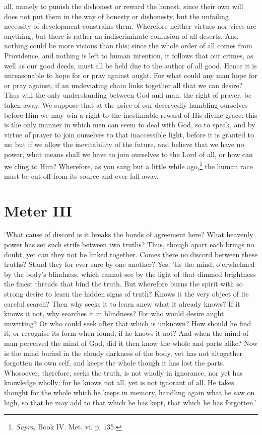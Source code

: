 all, namely to punish the dishonest or reward the honest, since their
own will does not put them in the way of  honesty or
dishonesty, but the unfailing necessity of development constrains
them. Wherefore neither virtues nor vices are anything, but there is
rather an indiscriminate confusion of all deserts. And nothing could
be more vicious than this; since the whole order of all comes from
Providence, and nothing is left to human intention, it follows that
our crimes, as well as our good deeds, must all be held due to the
author of all good. Hence it is unreasonable to hope for or pray
against aught. For what could any man hope for or pray against, if an
undeviating chain links together all that we can desire? Thus will the
only understanding between God and man, the right of prayer, be taken
away. We suppose that at the price of our deservedly humbling
ourselves before Him we may win a right to the inestimable reward of
His divine grace: this is the only manner in which men can seem to
deal with God, so to speak, and by virtue of prayer to join ourselves
to that inaccessible light, before it is granted to us; but if we
allow the inevitability of the future, and believe that we have no
power, what means shall we have to join ourselves to the Lord of all,
or how can we cling to Him? Wherefore, as you sang but a little while
ago,\footnote{\textit{Supra}, Book \textsc{IV}. Met. vi. p. 135.} the
human race must be cut off from its source and ever fall away.

\section*{Meter III}

`What cause of discord is it breaks the  bonds of agreement
here? What heavenly power has set such strife between two truths?
Thus, though apart each brings no doubt, yet can they not be linked
together. Comes there no discord between these truths? Stand they for
ever sure by one another? Yes, 'tis the mind, o'erwhelmed by the
body's blindness, which cannot see by the light of that dimmed
brightness the finest threads that bind the truth. But wherefore burns
the spirit with so strong desire to learn the hidden signs of truth?
Knows it the very object of its careful search? Then why seeks it to
learn anew what it already knows? If it knows it not, why searches it
in blindness? For who would desire aught unwitting? Or who could seek
after that which is unknown? How should he find it, or recognise its
form when found, if he knows it not? And when the mind of man
perceived the mind of God, did it then know the whole and parts alike?
Now is the mind buried in the cloudy darkness of the body, yet has not
altogether forgotten its own self, and keeps the whole though it has
lost the parts. Whosoever, therefore, seeks the truth, is not wholly
in ignorance, nor yet has knowledge wholly; for he knows not all, yet
is not ignorant of all. He takes thought for the whole which he keeps
in memory, handling again what he saw on high, so that he may add to
that which he has kept, that which he has forgotten.'

